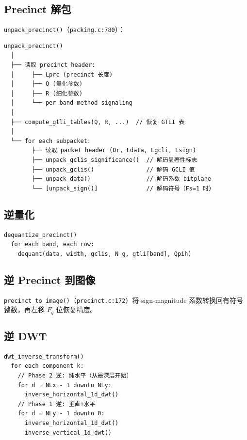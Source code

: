 \subsection{Precinct 解包}

\texttt{unpack\_precinct()}（\texttt{packing.c:780}）：

\begin{lstlisting}[numbers=none]
unpack_precinct()
  │
  ├── 读取 precinct header:
  │     ├── Lprc (precinct 长度)
  │     ├── Q (量化参数)
  │     ├── R (细化参数)
  │     └── per-band method signaling
  │
  ├── compute_gtli_tables(Q, R, ...)  // 恢复 GTLI 表
  │
  └── for each subpacket:
        ├── 读取 packet header (Dr, Ldata, Lgcli, Lsign)
        ├── unpack_gclis_significance()  // 解码显著性标志
        ├── unpack_gclis()               // 解码 GCLI 值
        ├── unpack_data()                // 解码系数 bitplane
        └── [unpack_sign()]              // 解码符号（Fs=1 时）
\end{lstlisting}

\subsection{逆量化}

\begin{lstlisting}[numbers=none]
dequantize_precinct()
  for each band, each row:
    dequant(data, width, gclis, N_g, gtli[band], Qpih)
\end{lstlisting}

\subsection{逆 Precinct 到图像}

\texttt{precinct\_to\_image()}（\texttt{precinct.c:172}）将 sign-magnitude 系数转换回有符号整数，再左移 $F_q$ 位恢复精度。

\subsection{逆 DWT}

\begin{lstlisting}[numbers=none]
dwt_inverse_transform()
  for each component k:
    // Phase 2 逆: 纯水平（从最深层开始）
    for d = NLx - 1 downto NLy:
      inverse_horizontal_1d_dwt()
    // Phase 1 逆: 垂直+水平
    for d = NLy - 1 downto 0:
      inverse_horizontal_1d_dwt()
      inverse_vertical_1d_dwt()
\end{lstlisting}

